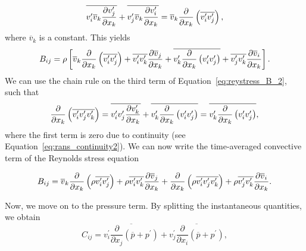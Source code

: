 \begin{equation}
	\overline{v_i^\prime \overline v_k \frac{\partial v_j^\prime}{\partial x_k} }
	+ \overline{v_j^\prime \overline v_k \frac{\partial v_{i\vphantom{j}}^\prime}{\partial x_k} } 
	= \overline v_k \frac{\partial}{\partial x_k} \left(\overline{v_i^\prime v_j^\prime}\right),
\end{equation}
where $\overline v_k$ is a constant. This yields
\begin{equation}
	B_{ij} = \rho \left[\overline v_k \frac{\partial}{\partial x_k} \left(\overline{v_i^\prime v_j^\prime}\right) 
	+ \overline{v_i^\prime v_k^\prime} \frac{\partial\overline v_j}{\partial x_k}
	+ \overline{v_k^\prime \frac{\partial}{\partial x_k} \left(v_i^\prime v_j^\prime\right)}
	+ \overline{v_j^\prime v_k^\prime}\frac{\partial\overline v_{i\vphantom{j}}}{\partial x_k}\right].
	\label{eq:reystress_B_2}
\end{equation}
We can use the chain rule on the third term of Equation~\ref{eq:reystress_B_2}, such that
\begin{equation}
	\frac{\partial}{\partial x_k} \left(\overline{v_i^\prime v_j^\prime v_k^\prime }\right) 
	= \overline{v_i^\prime v_j^\prime \frac{\partial v_k^\prime}{\partial x_k} } 
	+ \overline{v_k^\prime \frac{\partial\vphantom{v_k^\prime}}{\partial x_k}\left(v_i^\prime v_j^\prime\right)} 
	= \overline{v_k^\prime \frac{\partial\vphantom{v_k^\prime}}{\partial x_k}\left(v_i^\prime v_j^\prime\right)},
\end{equation}
where the first term is zero due to continuity (see Equation~\ref{eq:rans_continuity2}). We can now write the time-averaged convective term of the Reynolds stress equation
\begin{eqBox}
\begin{equation}
	B_{ij} = 
	\overline v_k \frac{\partial}{\partial x_k} \left(\rho \overline{v_i^\prime v_j^\prime}\right) 
	+ \rho \overline{v_i^\prime v_k^\prime}\frac{\partial \overline v_j }{\partial x_k}
	+ \frac{\partial}{\partial x_k} \left(\rho \overline{v_i^\prime v_j^\prime v_k^\prime }\right)
	+ \rho \overline{v_j^\prime v_k^\prime}\frac{\partial \overline v_{i\vphantom{j}}}{\partial x_k}.
\end{equation}
\end{eqBox}
Now, we move on to the pressure term. By splitting the instantaneous quantities, we obtain
\begin{equation}
	C_{ij} = 
	\overline{v_i^\prime \frac{\partial}{\partial x_j} \left(\overline p + p^\prime \right)}
	+ \overline{v_j^\prime \frac{\partial}{\partial x_i} \left(\overline p + p^\prime\right)},
\end{equation}
